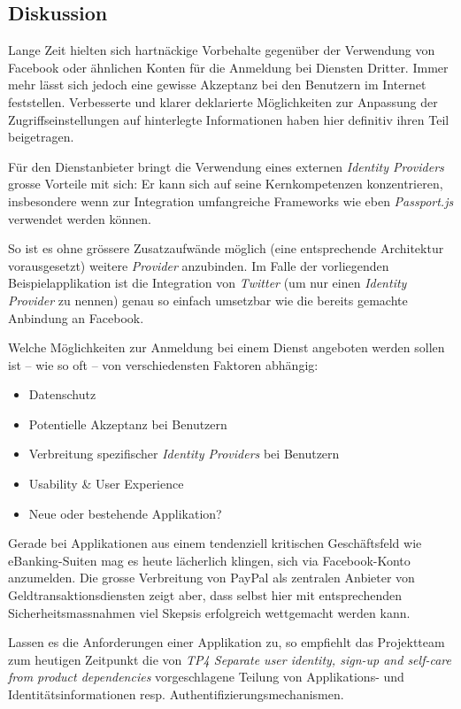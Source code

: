 \subsection*{Diskussion}

Lange Zeit hielten sich hartnäckige Vorbehalte gegenüber der Verwendung von Facebook oder ähnlichen Konten für die Anmeldung bei Diensten Dritter. Immer mehr lässt sich jedoch eine gewisse Akzeptanz bei den Benutzern im Internet feststellen. Verbesserte und klarer deklarierte Möglichkeiten zur Anpassung der Zugriffseinstellungen auf hinterlegte Informationen \cite{facebook-authdialog} haben hier definitiv ihren Teil beigetragen.

Für den Dienstanbieter bringt die Verwendung eines externen \emph{Identity Providers} grosse Vorteile mit sich: Er kann sich auf seine Kernkompetenzen konzentrieren, insbesondere wenn zur Integration umfangreiche Frameworks wie eben \emph{Passport.js} \cite{Passportjs} verwendet werden können.

So ist es ohne grössere Zusatzaufwände möglich (eine entsprechende Architektur vorausgesetzt) weitere \emph{Provider} anzubinden. Im Falle der vorliegenden Beispielapplikation ist die Integration von \emph{Twitter} (um nur einen \emph{Identity Provider} zu nennen) genau so einfach umsetzbar wie die bereits gemachte Anbindung an Facebook.

Welche Möglichkeiten zur Anmeldung bei einem Dienst angeboten werden sollen ist -- wie so oft -- von verschiedensten Faktoren abhängig:

\begin{itemize}
	\item Datenschutz
	\item Potentielle Akzeptanz bei Benutzern
	\item Verbreitung spezifischer \emph{Identity Providers} bei Benutzern
	\item Usability \& User Experience
	\item Neue oder bestehende Applikation?
\end{itemize}

Gerade bei Applikationen aus einem tendenziell kritischen Geschäftsfeld wie eBanking-Suiten mag es heute lächerlich klingen, sich via Facebook-Konto anzumelden. Die grosse Verbreitung von PayPal \cite{paypal} als zentralen Anbieter von Geldtransaktionsdiensten zeigt aber, dass selbst hier mit entsprechenden Sicherheitsmassnahmen viel Skepsis erfolgreich wettgemacht werden kann.

Lassen es die Anforderungen einer Applikation zu, so empfiehlt das Projektteam zum heutigen Zeitpunkt die von \emph{TP4 Separate user identity, sign-up and self-care from product dependencies} vorgeschlagene Teilung von Applikations- und Identitätsinformationen resp. Authentifizierungsmechanismen.
